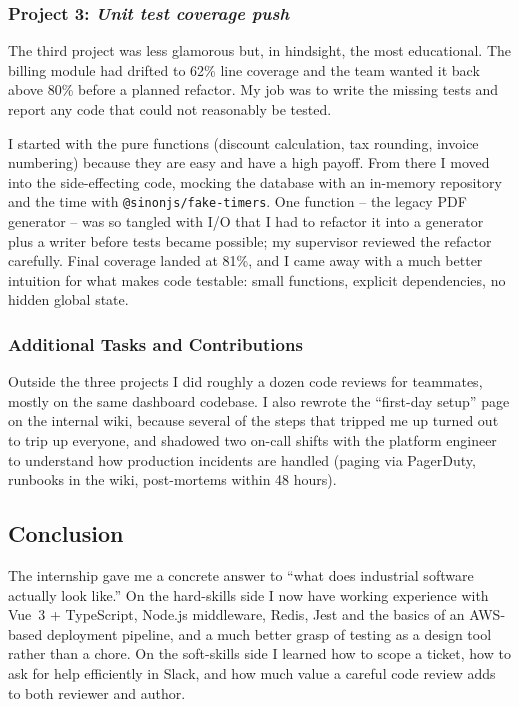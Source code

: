 \documentclass[11pt,a4paper]{article}
\begin{document}
\subsubsection{Project 3: \textit{Unit test coverage push}}
The third project was less glamorous but, in hindsight, the most educational. The billing module had drifted to 62\% line coverage and the team wanted it back above 80\% before a planned refactor. My job was to write the missing tests and report any code that could not reasonably be tested.

I started with the pure functions (discount calculation, tax rounding, invoice numbering) because they are easy and have a high payoff. From there I moved into the side-effecting code, mocking the database with an in-memory repository and the time with \texttt{@sinonjs/fake-timers}. One function -- the legacy PDF generator -- was so tangled with I/O that I had to refactor it into a generator plus a writer before tests became possible; my supervisor reviewed the refactor carefully. Final coverage landed at 81\%, and I came away with a much better intuition for what makes code testable: small functions, explicit dependencies, no hidden global state.

\subsubsection{Additional Tasks and Contributions}
Outside the three projects I did roughly a dozen code reviews for teammates, mostly on the same dashboard codebase. I also rewrote the ``first-day setup'' page on the internal wiki, because several of the steps that tripped me up turned out to trip up everyone, and shadowed two on-call shifts with the platform engineer to understand how production incidents are handled (paging via PagerDuty, runbooks in the wiki, post-mortems within 48 hours).

\subsection{Conclusion}
The internship gave me a concrete answer to ``what does industrial software actually look like.'' On the hard-skills side I now have working experience with Vue~3 + TypeScript, Node.js middleware, Redis, Jest and the basics of an AWS-based deployment pipeline, and a much better grasp of testing as a design tool rather than a chore. On the soft-skills side I learned how to scope a ticket, how to ask for help efficiently in Slack, and how much value a careful code review adds to both reviewer and author.
\end{document}
